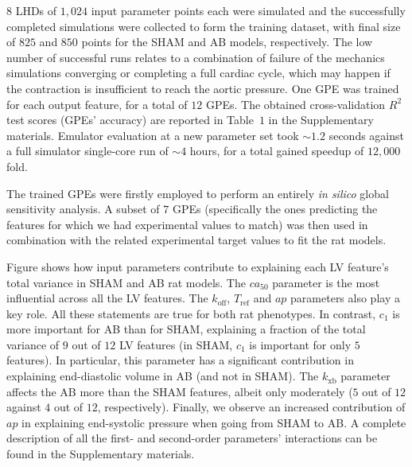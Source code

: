 \vspace{0.2cm}
$8$ LHDs of $1,024$ input parameter points each were simulated and the successfully completed simulations were collected to form the training dataset, with final size of $825$ and $850$ points for the SHAM and AB models, respectively. The low number of successful runs relates to a combination of failure of the mechanics simulations converging or completing a full cardiac cycle, which may happen if the contraction is insufficient to reach the aortic pressure. One GPE was trained for each output feature, for a total of $12$ GPEs. The obtained cross-validation $R^2$ test scores (GPEs' accuracy) are reported in Table~$1$ in the Supplementary materials. Emulator evaluation at a new parameter set took $\sim 1.2$ seconds against a full simulator single-core run of $\sim 4$ hours, for a total gained speedup of $12,000$ fold.

\vspace{0.2cm}
The trained GPEs were firstly employed to perform an entirely \textit{in silico} global sensitivity analysis. A subset of $7$ GPEs (specifically the ones predicting the features for which we had experimental values to match) was then used in combination with the related experimental target values to fit the rat models.

\vspace{0.2cm}
Figure shows how input parameters contribute to explaining each LV feature's total variance in SHAM and AB rat models. The $ca_{50}$ parameter is the most influential across all the LV features. The $k_{\textrm{off}}$, $T_{\textrm{ref}}$ and $ap$ parameters also play a key role. All these statements are true for both rat phenotypes. In contrast, $c_1$ is more important for AB than for SHAM, explaining a fraction of the total variance of $9$ out of $12$ LV features (in SHAM, $c_1$ is important for only $5$ features). In particular, this parameter has a significant contribution in explaining end-diastolic volume in AB (and not in SHAM). The $k_{\textrm{xb}}$ parameter affects the AB more than the SHAM features, albeit only moderately ($5$ out of $12$ against $4$ out of $12$, respectively). Finally, we observe an increased contribution of $ap$ in explaining end-systolic pressure when going from SHAM to AB. A complete description of all the first- and second-order parameters' interactions can be found in the Supplementary materials.

